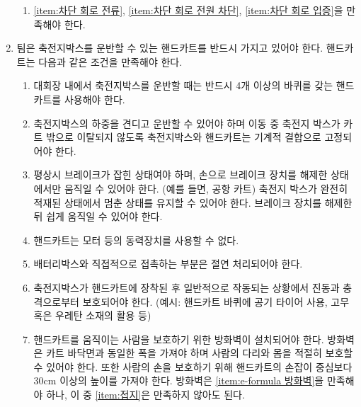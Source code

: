 \documentclass[final,a4paper,10pt]{report}
\begin{document}
\begin{enumerate}
\begin{enumerate}
      \item \cref{item:차단 회로 전류}, \cref{item:차단 회로 전원 차단}, \cref{item:차단 회로 입증}을 만족해야 한다.
    \end{enumerate}
    
  \item 팀은 축전지박스를 운반할 수 있는 핸드카트를 반드시 가지고 있어야 한다. 핸드카트는 다음과 같은 조건을 만족해야 한다.
    \begin{enumerate}
      \item 대회장 내에서 축전지박스를 운반할 때는 반드시 4개 이상의 바퀴를 갖는 핸드카트를 사용해야 한다.
      \item 축전지박스의 하중을 견디고 운반할 수 있어야 하며 이동 중 축전지 박스가 카트 밖으로 이탈되지 않도록 축전지박스와 핸드카트는 기계적 결합으로 고정되어야 한다.
      \item 평상시 브레이크가 잡힌 상태여야 하며, 손으로 브레이크 장치를 해제한 상태에서만 움직일 수 있어야 한다. (예를 들면, 공항 카트) 축전지 박스가 완전히 적재된 상태에서 멈춘 상태를 유지할 수 있어야 한다. 브레이크 장치를 해제한 뒤 쉽게 움직일 수 있어야 한다.
      \item 핸드카트는 모터 등의 동력장치를 사용할 수 없다.
      \item 배터리박스와 직접적으로 접촉하는 부분은 절연 처리되어야 한다.
      \item 축전지박스가 핸드카트에 장착된 후 일반적으로 작동되는 상황에서 진동과 충격으로부터 보호되어야 한다. (예시: 핸드카트 바퀴에 공기 타이어 사용, 고무 혹은 우레탄 소재의 활용 등)
      \item 핸드카트를 움직이는 사람을 보호하기 위한 방화벽이 설치되어야 한다. 방화벽은 카트 바닥면과 동일한 폭을 가져야 하며 사람의 다리와 몸을 적절히 보호할 수 있어야 한다. 또한 사람의 손을 보호하기 위해 핸드카트의 손잡이 중심보다 30cm 이상의 높이를 가져야 한다. 방화벽은 \cref{item:e-formula 방화벽}을 만족해야 하나, 이 중 \cref{item:접지}은 만족하지 않아도 된다.
    \end{enumerate}
\end{enumerate}
\end{document}
